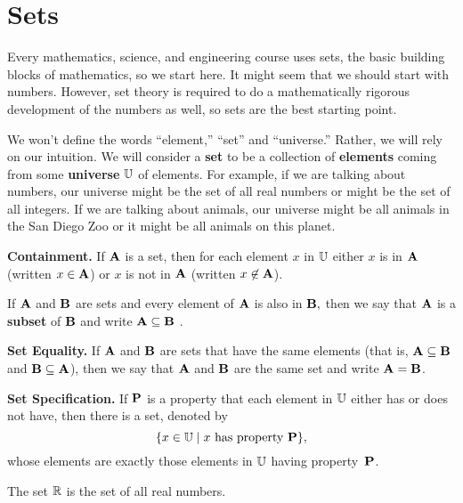 \mainmatter

\chapter{Sets}

Every mathematics, science, and engineering course uses sets, the basic building blocks of mathematics, so we start here.  It might seem that we should start with numbers.  However, set theory is required to do a mathematically rigorous development of the numbers as well, so sets are the best starting point.

We won't define the words ``element,'' ``set'' and ``universe.''  Rather, we will rely on our intuition. We will consider a \textbf{set} to be a collection of \textbf{elements} coming from some \textbf{universe} $\mathbb U$ of elements.  For example, if we are talking about numbers, our universe might be the set of all real numbers or might be the set of all integers.  If we are talking about animals, our universe might be all animals in the San Diego Zoo or it might be all animals on this planet.


\begin{axm}
\textbf{Containment.}
If $\mathbf A$ is a set, then for each element $x$ in $\mathbb U$ either $x$ is in $\mathbf A$ (written $x\in \mathbf A$) or $x$ is not in $\mathbf A$ (written $x \not \in \mathbf A$).
\end{axm}

\begin{dfn}
If $\mathbf A$ and $\mathbf B$ are sets and every element of $\mathbf A$ is also in $\mathbf B,$ then we say that $\mathbf A$ is a \textbf{subset} of $\mathbf B$ and write $\mathbf A \subseteq \mathbf B$ .
\end{dfn}

\begin{axm}\label{seteq}
\textbf{Set Equality.} If $\mathbf A$ and $\mathbf B$ are sets that have the same elements (that is, $\mathbf A \subseteq \mathbf B$ and $\mathbf B \subseteq \mathbf A$), then we say that $\mathbf A$ and $\mathbf B$ are the same set and write $\mathbf A = \mathbf B$.
\end{axm}

\begin{axm}
\textbf{Set Specification.} If\/ $\mathbf P$ is a property that each element in $\mathbb U$ either has or does not have, then there is a set, denoted by  $$ \{x \in \mathbb U \mid  x \mbox{ has property }  \mathbf P \},$$ whose elements are exactly those elements in $\mathbb U$ having property~$\mathbf P$.
\end{axm}

\begin{dfn}
The set $\mathbb R$ is the set of all real numbers.
\end{dfn}

